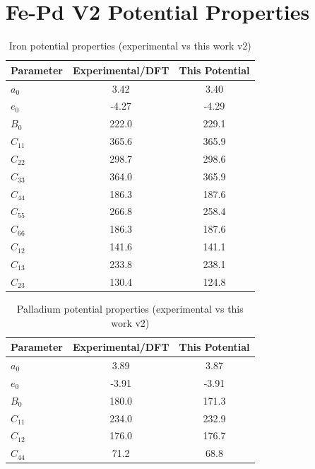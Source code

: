 \FloatBarrier
\section{Fe-Pd V2 Potential Properties}

\begin{table}[ht]
\renewcommand{\arraystretch}{1.2}
\begin{tabular}{lcc}
\hline\hline
Parameter & Experimental/DFT & This Potential\\
\hline\hline
$a_0$ & 3.42   &  3.40  \\
$e_0$ & -4.27  & -4.29  \\
$B_0$ & 222.0  &  229.1  \\
$C_{11}$ & 365.6  &  365.9 \\
$C_{22}$ & 298.7  &  298.6 \\
$C_{33}$ & 364.0  &  365.9 \\
$C_{44}$ & 186.3  &  187.6  \\
$C_{55}$ & 266.8  &  258.4 \\
$C_{66}$ & 186.3  &  187.6 \\
$C_{12}$ & 141.6  &  141.1 \\
$C_{13}$ & 233.8  &  238.1 \\
$C_{23}$ & 130.4  &  124.8 \\
\hline\hline
\end{tabular}
\label{tab:ironpotpropertiesv2}
\caption{Iron potential properties (experimental vs this work v2)}
\end{table}

\begin{table}[ht]
\renewcommand{\arraystretch}{1.2}
\begin{tabular}{lcc}
\hline\hline
Parameter & Experimental/DFT & This Potential\\
\hline\hline
$a_0$ & 3.89 & 3.87  \\
$e_0$ & -3.91  & -3.91  \\
$B_0$ & 180.0  & 171.3  \\
$C_{11}$ & 234.0  & 232.9  \\
$C_{12}$ & 176.0  & 176.7  \\
$C_{44}$ & 71.2  & 68.8  \\
\hline\hline
\end{tabular}
\label{tab:palladiumpotpropertiesv2}
\caption{Palladium potential properties (experimental vs this work v2)}
\end{table}















